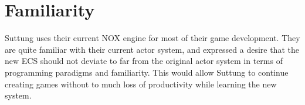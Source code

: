 \section{Familiarity}
Suttung uses their current NOX engine for most of their game development.
They are quite familiar with their current actor system, and expressed a desire that the new
ECS should not deviate to far from the original actor system in terms of programming paradigms
and familiarity.
This would allow Suttung to continue creating games without to much loss of productivity while
learning the new system.
